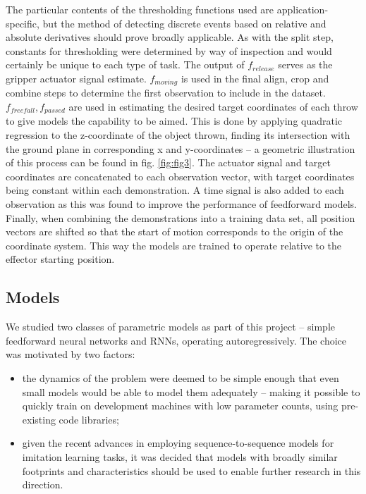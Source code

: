 \documentclass{article}
\begin{document}
The particular contents of the thresholding functions used are application-specific, but the method of detecting discrete events based on relative and absolute derivatives should prove broadly applicable. As with the split step, constants for thresholding were determined by way of inspection and would certainly be unique to each type of task. The output of $f_{release}$ serves as the gripper actuator signal estimate. $f_{moving}$ is used in the final align, crop and combine steps to determine the first observation to include in the dataset. $f_{freefall}, f_{passed}$ are used in estimating the desired target coordinates of each throw to give models the capability to be aimed. This is done by applying quadratic regression to the z-coordinate of the object thrown, finding its intersection with the ground plane in corresponding x and y-coordinates -- a geometric illustration of this process can be found in fig. \ref{fig:fig3}. The actuator signal and target coordinates are concatenated to each observation vector, with target coordinates being constant within each demonstration. A time signal is also added to each observation as this was found to improve the performance of feedforward models. Finally, when combining the demonstrations into a training data set, all position vectors are shifted so that the start of motion corresponds to the origin of the coordinate system. This way the models are trained to operate relative to the effector starting position.

\subsection{Models}
\label{sec:models}

We studied two classes of parametric models as part of this project -- simple feedforward neural networks and RNNs, operating autoregressively. The choice was motivated by two factors:
\begin{itemize}
	\item the dynamics of the problem were deemed to be simple enough that even small models would be able to model them adequately -- making it possible to quickly train on development machines with low parameter counts, using pre-existing code libraries;
	\item given the recent advances in employing sequence-to-sequence models for imitation learning tasks, it was decided that models with broadly similar footprints and characteristics should be used to enable further research in this direction.
\end{itemize}
\end{document}
